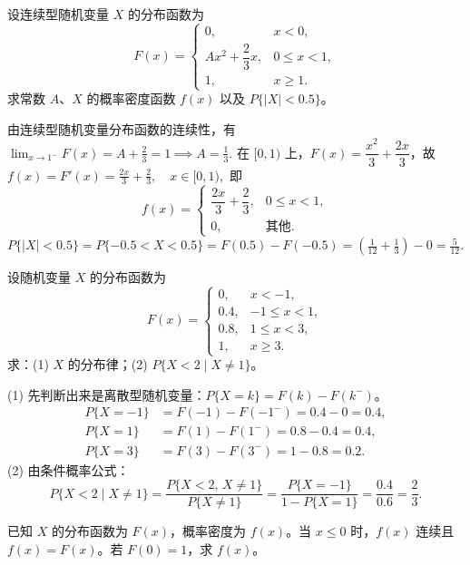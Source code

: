 \documentclass[lang=cn,11pt]{elegantbook}
\begin{document}
\begin{exercise}\label{exer:2-4}
设连续型随机变量 $X$ 的分布函数为
\[
F(x) = \begin{cases}
0, & x < 0, \\
Ax^2 + \dfrac{2}{3}x, & 0 \le x < 1, \\
1, & x \ge 1.
\end{cases}
\]
求常数 $A$、$X$ 的概率密度函数 $f(x)$ 以及 $P\{|X| < 0.5\}$。
\end{exercise}

\begin{solution}
由连续型随机变量分布函数的连续性，有
\(
\lim_{x \to 1^-} F(x) = A + \frac{2}{3} = 1 \implies A = \frac{1}{3}.
\)
在 $[0,1)$ 上，$F(x) = \dfrac{x^2}{3} + \dfrac{2x}{3}$，故
\(
f(x) = F'(x) = \frac{2x}{3} + \frac{2}{3}, \quad x \in [0,1),
\)
即
\[
f(x) = \begin{cases}
\dfrac{2x}{3} + \dfrac{2}{3}, & 0 \le x < 1, \\
0, & \text{其他}.
\end{cases}
\]
\(
P\{|X| < 0.5\} = P\{-0.5 < X < 0.5\} = F(0.5) - F(-0.5) = \left(\frac{1}{12} + \frac{1}{3}\right) - 0 = \frac{5}{12}.
\)
\end{solution}


\begin{exercise}\label{exer:2-26}
设随机变量 $X$ 的分布函数为
\[
F(x) = \begin{cases}
0, & x<-1, \\
0.4, & -1 \le x<1, \\
0.8, & 1 \le x<3, \\
1, & x \ge 3.
\end{cases}
\]
求：(1) $X$ 的分布律；(2) $P\{X<2 \mid X \neq 1\}$。
\end{exercise}

\begin{solution}
(1) 先判断出来是离散型随机变量：$P\{X=k\} = F(k) - F(k^-)$。
\begin{align*}
P\{X=-1\} &= F(-1) - F(-1^-) = 0.4 - 0 = 0.4, \\
P\{X=1\} &= F(1) - F(1^-) = 0.8 - 0.4 = 0.4, \\
P\{X=3\} &= F(3) - F(3^-) = 1 - 0.8 = 0.2.
\end{align*}
(2) 由条件概率公式：
\[
P\{X<2 \mid X \neq 1\} = \frac{P\{X<2,\, X \neq 1\}}{P\{X \neq 1\}} = \frac{P\{X=-1\}}{1-P\{X=1\}} = \frac{0.4}{0.6} = \frac{2}{3}.
\]
\end{solution}




\begin{exercise}\label{exer:2-6}
已知 $X$ 的分布函数为 $F(x)$，概率密度为 $f(x)$。当 $x \le 0$ 时，$f(x)$ 连续且 $f(x) = F(x)$。若 $F(0) = 1$，求 $f(x)$。
\end{exercise}
\end{document}
